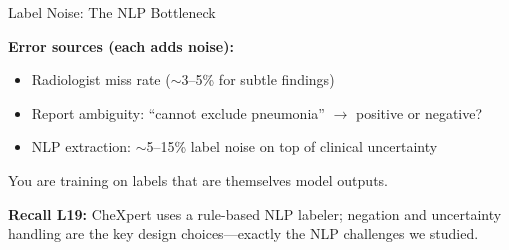 \documentclass[aspectratio=169,10pt]{beamer}
\begin{document}
\begin{frame}{Label Noise: The NLP Bottleneck}
{\small
\begin{center}
\end{center}
}

\vspace{0.2em}
\textbf{Error sources (each adds noise):}
\begin{itemize}
    \item Radiologist miss rate ($\sim$3--5\% for subtle findings)
    \item Report ambiguity: ``cannot exclude pneumonia'' $\to$ positive or negative?
    \item NLP extraction: $\sim$5--15\% label noise on top of clinical uncertainty
\end{itemize}

\alert{You are training on labels that are themselves model outputs.}

{\small \textbf{Recall L19:} CheXpert uses a rule-based NLP labeler; negation and uncertainty handling are the key design choices---exactly the NLP challenges we studied.}
\end{frame}
\end{document}
